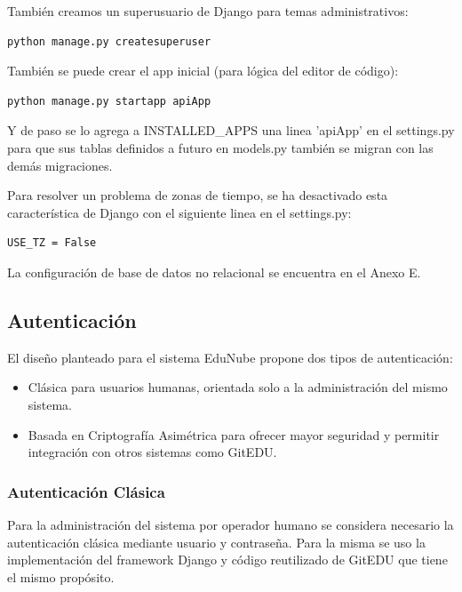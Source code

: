 También creamos un superusuario de Django para temas administrativos:
\begin{lstlisting}
python manage.py createsuperuser
\end{lstlisting}

También se puede crear el app inicial (para lógica del editor de código):
\begin{lstlisting}
python manage.py startapp apiApp
\end{lstlisting}

Y de paso se lo agrega a INSTALLED\_APPS una linea 'apiApp' en el settings.py para que sus tablas definidos a futuro en models.py también se migran con las demás migraciones.

Para resolver un problema de zonas de tiempo, se ha desactivado esta característica de Django con el siguiente linea en el settings.py:
\lstset{language=Python}
\begin{lstlisting}
USE_TZ = False
\end{lstlisting}
\lstset{language=Bash}

La configuración de base de datos no relacional se encuentra en el Anexo E.

\subsection{Autenticación}
El diseño planteado para el sistema EduNube propone dos tipos de autenticación:
\begin{itemize}
\item Clásica para usuarios humanas, orientada solo a la administración del mismo sistema.
\item Basada en Criptografía Asimétrica para ofrecer mayor seguridad y permitir integración con otros sistemas como GitEDU.
\end{itemize}

\subsubsection{Autenticación Clásica}
Para la administración del sistema por operador humano se considera necesario la autenticación clásica mediante usuario y contraseña. Para la misma se uso la implementación del framework Django y código reutilizado de GitEDU que tiene el mismo propósito.

